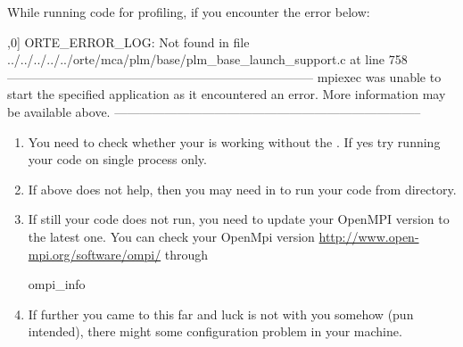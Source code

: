 \begin{problem}
While running  code for profiling, if you 
encounter the error below:
\begin{Output}
[G:12221] [[39704,0],0] ORTE_ERROR_LOG: Not found in file ../../../../../orte/mca/plm/base/plm_base_launch_support.c at line 758
--------------------------------------------------------------------------
mpiexec was unable to start the specified application as it encountered an error.
More information may be available above.
--------------------------------------------------------------------------
\end{Output}  
\end{problem}

\begin{solution}
\begin{enumerate}
\item You need to check whether your  is working without the . If yes try running your  code on single process only.
\item If above does not help, then you may need  in  to run your code from  directory.
\item If still your code does not run, you need to update your OpenMPI version to the latest one. You can check your OpenMpi version \url{http://www.open-mpi.org/software/ompi/} through 
\begin{Output}
ompi_info
\end{Output}
\item If further you came to this far and luck is not with you somehow (pun intended), there might some configuration problem in your machine.
\end{enumerate}  
\end{solution}

